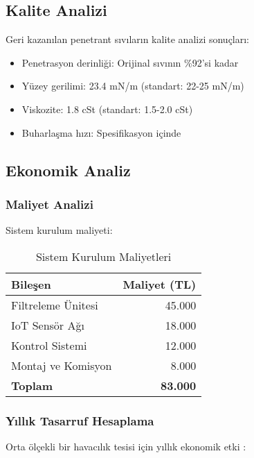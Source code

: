 \documentclass[12pt,a4paper]{article}
\begin{document}
\subsection{Kalite Analizi}

Geri kazanılan penetrant sıvıların kalite analizi sonuçları:

\begin{itemize}
\item Penetrasyon derinliği: Orijinal sıvının \%92'si kadar
\item Yüzey gerilimi: 23.4 mN/m (standart: 22-25 mN/m)
\item Viskozite: 1.8 cSt (standart: 1.5-2.0 cSt)
\item Buharlaşma hızı: Spesifikasyon içinde
\end{itemize}

\subsection{Ekonomik Analiz}

\subsubsection{Maliyet Analizi}

Sistem kurulum maliyeti:

\begin{table}[H]
\centering
\caption{Sistem Kurulum Maliyetleri}
\begin{tabular}{lr}
\toprule
\textbf{Bileşen} & \textbf{Maliyet (TL)} \\
\midrule
Filtreleme Ünitesi & 45.000 \\
IoT Sensör Ağı & 18.000 \\
Kontrol Sistemi & 12.000 \\
Montaj ve Komisyon & 8.000 \\
\textbf{Toplam} & \textbf{83.000} \\
\bottomrule
\end{tabular}
\end{table}

\subsubsection{Yıllık Tasarruf Hesaplama}

Orta ölçekli bir havacılık tesisi için yıllık ekonomik etki \cite{anderson2019economic, johnson2018cost}:
\end{document}
